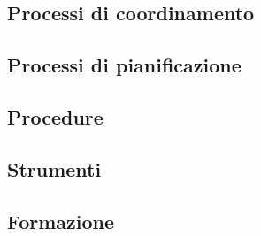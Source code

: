 \subsection{Processi di coordinamento}

\subsection{Processi di pianificazione}

\subsection{Procedure}

\subsection{Strumenti}

\subsection{Formazione}
